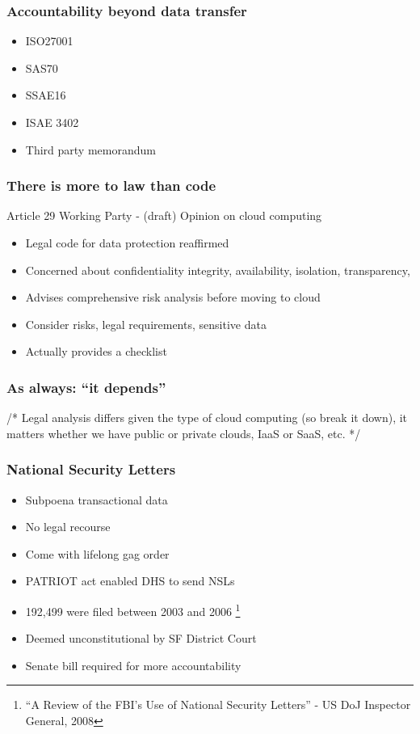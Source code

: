 \documentclass{beamer}
\begin{document}
\begin{frame}
    \frametitle{Accountability beyond data transfer}
    \begin{itemize}
    \item ISO27001
    \item SAS70 %
    \item SSAE16 %
    \item ISAE 3402 %
    \item Third party memorandum
    \end{itemize}
\end{frame}

\begin{frame}
    \frametitle{There is more to law than code}
    Article 29 Working Party - (draft) Opinion on cloud computing
    \begin{itemize}
    \item Legal code for data protection reaffirmed
    \item Concerned about confidentiality integrity, availability, isolation, transparency, 
    \item Advises comprehensive risk analysis before moving to cloud
    \item Consider risks, legal requirements, sensitive data
    \item Actually provides a checklist
    \end{itemize}
\end{frame}

\begin{frame}
    \frametitle{As always: ``it depends''}
    /* Legal analysis differs given the type of cloud computing (so break it
    down), it matters whether we have public or private clouds, IaaS or SaaS,
    etc. */
\end{frame}

\begin{frame}
    \frametitle{National Security Letters}
    \begin{itemize}
    \item Subpoena transactional data
    \item No legal recourse
    \item Come with lifelong gag order
    \item PATRIOT act enabled DHS to send NSLs
    \item 192,499 were filed between 2003 and 2006 \footnote{``A Review of the FBI's Use of National Security Letters'' - US DoJ Inspector General, 2008}
    \item Deemed unconstitutional by SF District Court
    \item Senate bill required for more accountability
    \end{itemize}
\end{frame}
\end{document}
